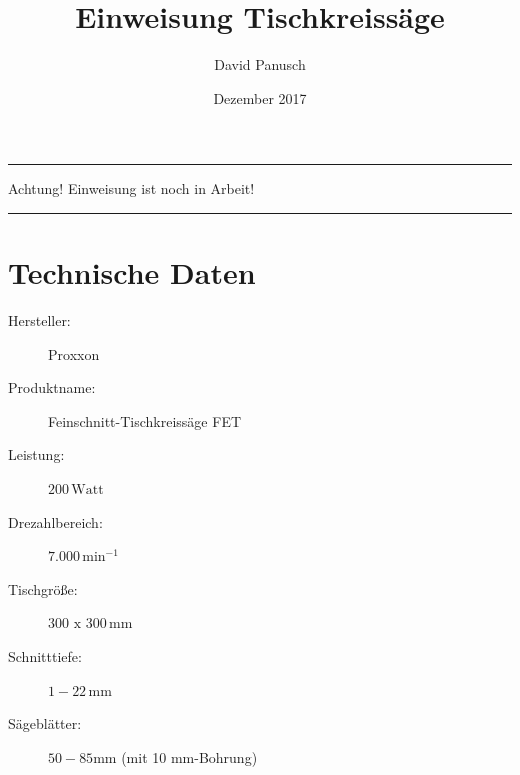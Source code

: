 \documentclass{\basedir/fablab-document}
\date{Dezember 2017}
\author{David Panusch}
\title{Einweisung Tischkreissäge}
\begin{document}
\dosecttoc
\faketableofcontents
{}
\maketitle

\color{red}
\hrule
\begin{center}
\large{Achtung! Einweisung ist noch in Arbeit!}
\vspace{0.1cm}
\end{center}
\hrule
\color{black}

\section{Technische Daten}
\begin{description}
	
    \item[Hersteller:] Proxxon
    \item[Produktname:] Feinschnitt-Tischkreissäge FET
    \item[Leistung:] $200\,\mathrm{Watt}$
    \item[Drezahlbereich:] $7.000\,\mathrm{min}^{-1}$
    \item[Tischgröße:] $300 \mathrm{\,\,x\,\,} 300\,\mathrm{mm}$
    \item[Schnitttiefe:] $1 - 22\,\mathrm{mm}$ 
    \item[Sägeblätter:] $50 - 85 \mathrm{mm}$ (mit 10 mm-Bohrung)
    
\end{description}
\end{document}
